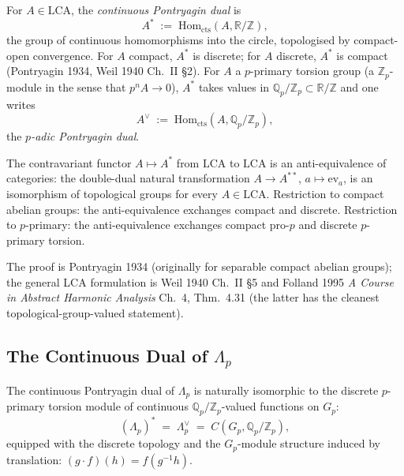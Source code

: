 \begin{definition}
\label{v4-arith:w5-d:cts-dual:def:pontryagin}
For \(A\in\mathrm{LCA}\), the
\emph{continuous Pontryagin dual} is
\begin{equation}
\label{v4-arith:w5-d:eq:pontryagin-def}
A^{\ast}\;:=\;\mathrm{Hom}_{\mathrm{cts}}(A,\mathbb{R}/\mathbb{Z}),
\end{equation}
the group of continuous homomorphisms into the circle, topologised by
compact-open convergence. For \(A\) compact, \(A^{\ast}\) is discrete;
for \(A\) discrete, \(A^{\ast}\) is compact (Pontryagin 1934, Weil 1940
Ch.~II \S2). For \(A\) a \(p\)-primary torsion group (a \(\mathbb{Z}_{p}\)-module
in the sense that \(p^{n}A\to 0\)), \(A^{\ast}\) takes values in
\(\mathbb{Q}_{p}/\mathbb{Z}_{p}\subset\mathbb{R}/\mathbb{Z}\) and one
writes
\begin{equation}
\label{v4-arith:w5-d:eq:p-pontryagin}
A^{\vee}\;:=\;\mathrm{Hom}_{\mathrm{cts}}(A,\mathbb{Q}_{p}/\mathbb{Z}_{p}),
\end{equation}
the \emph{\(p\)-adic Pontryagin dual}.
\end{definition}

\begin{theorem}
\label{v4-arith:w5-d:cts-dual:thm:pontryagin}
The contravariant functor \(A\mapsto A^{\ast}\)
from \(\mathrm{LCA}\) to \(\mathrm{LCA}\) is an anti-equivalence of
categories: the double-dual natural transformation
\(A\to A^{\ast\ast}\), \(a\mapsto\mathrm{ev}_{a}\), is an isomorphism of
topological groups for every \(A\in\mathrm{LCA}\). Restriction to compact
abelian groups: the anti-equivalence exchanges compact and discrete.
Restriction to \(p\)-primary: the anti-equivalence exchanges compact
pro-\(p\) and discrete \(p\)-primary torsion.
\end{theorem}

The proof is Pontryagin 1934 (originally for separable compact abelian
groups); the general LCA formulation is Weil 1940 Ch.~II \S5 and
Folland 1995 \emph{A Course in Abstract Harmonic Analysis} Ch.~4,
Thm.~4.31 (the latter has the cleanest topological-group-valued
statement).

\subsection{The Continuous Dual of \(\Lambda_{p}\)}
\label{v4-arith:w5-d:cts-dual:dual-of-Lambda}

\begin{proposition}
\label{v4-arith:w5-d:cts-dual:prop:main}
The continuous Pontryagin dual of
\(\Lambda_{p}\) is naturally isomorphic to the discrete \(p\)-primary
torsion module of continuous \(\mathbb{Q}_{p}/\mathbb{Z}_{p}\)-valued
functions on \(G_{p}\):
\begin{equation}
\label{v4-arith:w5-d:eq:dual-of-lambda}
(\Lambda_{p})^{\ast}\;=\;\Lambda_{p}^{\vee}\;=\;C(G_{p},\mathbb{Q}_{p}/\mathbb{Z}_{p}),
\end{equation}
equipped with the discrete topology and the \(G_{p}\)-module structure
induced by translation: \((g\cdot f)(h)=f(g^{-1}h)\).
\end{proposition}

